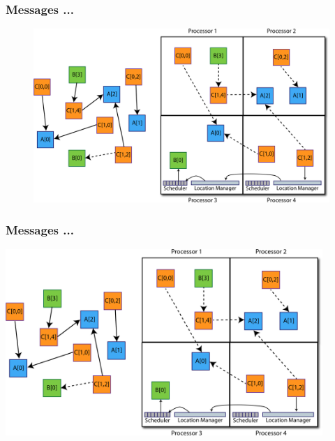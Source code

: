 \begin{frame}
  \frametitle{Messages ...
  }
  \begin{figure}
  \includegraphics[trim=0in 0in 14in 2in, clip=true, height=0.85\textheight]{../figures/elements2.pdf}
  \end{figure}
\end{frame}

\begin{frame}
  \frametitle{Messages ...
  }
  \begin{center}\includegraphics[width=0.9\textwidth]{../figures/elements2.pdf}\end{center}
\end{frame}
